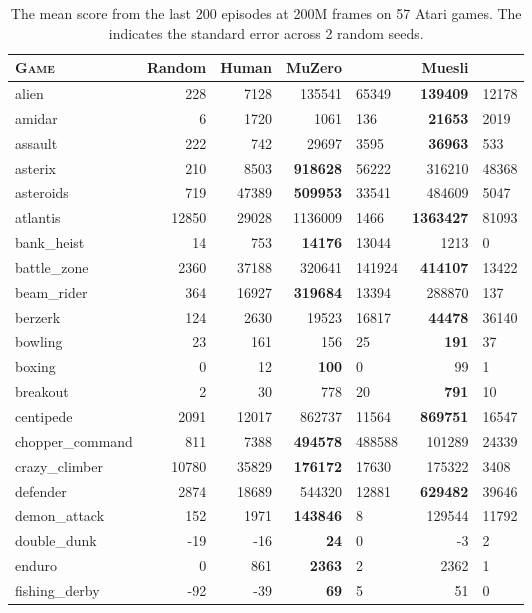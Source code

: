 \documentclass{article}
\begin{document}
\begin{table*}[tb]
\caption{The mean score from the last 200 episodes at 200M frames on 57 Atari games. The  indicates the standard error across 2 random seeds.
}
\label{tab:score57}
\begin{center}
\begin{small}
\begin{tabular}{lrrrlrl}
\toprule
\textsc{Game} & Random & Human & MuZero & & Muesli & \\
\midrule
alien & 228 & 7128 & 135541 & 65349 & {\bf 139409} & 12178 \\
amidar & 6 & 1720 & 1061 & 136 & {\bf 21653} & 2019 \\
assault & 222 & 742 & 29697 & 3595 & {\bf 36963} & 533 \\
asterix & 210 & 8503 & {\bf 918628} & 56222 & 316210 & 48368 \\
asteroids & 719 & 47389 & {\bf 509953} & 33541 & 484609 & 5047 \\
atlantis & 12850 & 29028 & 1136009 & 1466 & {\bf 1363427} & 81093 \\
bank\_heist & 14 & 753 & {\bf 14176} & 13044 & 1213 & 0 \\
battle\_zone & 2360 & 37188 & 320641 & 141924 & {\bf 414107} & 13422 \\
beam\_rider & 364 & 16927 & {\bf 319684} & 13394 & 288870 & 137 \\
berzerk & 124 & 2630 & 19523 & 16817 & {\bf 44478} & 36140 \\
bowling & 23 & 161 & 156 & 25 & {\bf 191} & 37 \\
boxing & 0 & 12 & {\bf 100} & 0 & 99 & 1 \\
breakout & 2 & 30 & 778 & 20 & {\bf 791} & 10 \\
centipede & 2091 & 12017 & 862737 & 11564 & {\bf 869751} & 16547 \\
chopper\_command & 811 & 7388 & {\bf 494578} & 488588 & 101289 & 24339 \\
crazy\_climber & 10780 & 35829 & {\bf 176172} & 17630 & 175322 & 3408 \\
defender & 2874 & 18689 & 544320 & 12881 & {\bf 629482} & 39646 \\
demon\_attack & 152 & 1971 & {\bf 143846} & 8 & 129544 & 11792 \\
double\_dunk & -19 & -16 & {\bf 24} & 0 & -3 & 2 \\
enduro & 0 & 861 & {\bf 2363} & 2 & 2362 & 1 \\
fishing\_derby & -92 & -39 & {\bf 69} & 5 & 51 & 0 \\

\end{tabular}
\end{small}
\end{center}
\end{table*}
\end{document}

